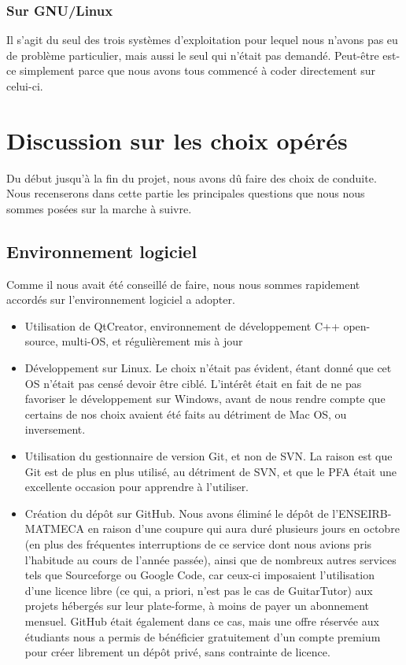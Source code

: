 \documentclass[a4paper,11pt]{article}
\begin{document}
\subsubsection*{Sur GNU/Linux}

Il s'agit du seul des trois systèmes d'exploitation pour lequel nous n'avons pas eu de problème particulier, mais aussi le seul qui n'était pas demandé. Peut-être est-ce simplement parce que nous avons tous commencé à coder directement sur celui-ci.

\clearpage

\section{Discussion sur les choix opérés}

Du début jusqu'à la fin du projet, nous avons dû faire des choix de conduite. Nous recenserons dans cette partie les principales questions que nous nous sommes posées sur la marche à suivre.

\subsection{Environnement logiciel}

Comme il nous avait été conseillé de faire, nous nous sommes rapidement accordés sur l'environnement logiciel a adopter.
\begin{itemize}
 \item Utilisation de QtCreator, environnement de développement C++ open-source, multi-OS, et régulièrement mis à jour
 \item Développement sur Linux. Le choix n'était pas évident, étant donné que cet OS n'était pas censé devoir être ciblé. L'intérêt était en fait de ne pas favoriser le développement sur Windows, avant de nous rendre compte que certains de nos choix avaient été faits au détriment de Mac OS, ou inversement.
 \item Utilisation du gestionnaire de version Git, et non de SVN. La raison est que Git est de plus en plus utilisé, au détriment de SVN, et que le PFA était une excellente occasion pour apprendre à l'utiliser.
 \item Création du dépôt sur GitHub. Nous avons éliminé le dépôt de l'ENSEIRB-MATMECA en raison d'une coupure qui aura duré plusieurs jours en octobre (en plus des fréquentes interruptions de ce service dont nous avions pris l'habitude au cours de l'année passée), ainsi que de nombreux autres services tels que Sourceforge ou Google Code, car ceux-ci imposaient l'utilisation d'une licence libre (ce qui, a priori, n'est pas le cas de GuitarTutor) aux projets hébergés sur leur plate-forme, à moins de payer un abonnement mensuel. GitHub était également dans ce cas, mais une offre réservée aux étudiants nous a permis de bénéficier gratuitement d'un compte premium pour créer librement un dépôt privé, sans contrainte de licence.
\end{itemize}
\end{document}
